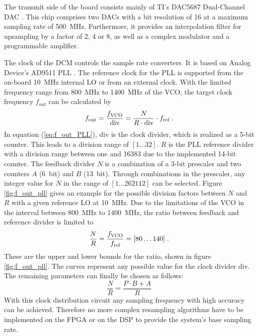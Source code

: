 The transmit side of the board consists mainly of \ac{TI}'s DAC5687 Dual\--Chan\-nel \ac{DAC} \cite{dac5687}. This chip comprises two \acp{DAC} with a bit resolution of 16 at a maximum sampling rate of \SI{500}{MHz}. Furthermore, it provides an interpolation filter for upsampling by a factor of 2, 4 or 8, as well as a complex modulator and a programmable amplifier. 

The clock of the \ac{DCM} controls the sample rate converters. It is based on Analog Device's AD9511 \ac{PLL} \cite{ad9511}. The reference clock for the \ac{PLL} is supported from the on-board \SI{10}{MHz} internal \ac{LO} or from an external clock. With the limited frequency range from \SI{800}{MHz} to \SI{1400}{MHz} of the \ac{VCO}, the target clock frequency $f_{out}$ can be calculated by
\begin{equation}
	f_{\textnormal{out}} =  \frac{f_{\textnormal{VCO}}}{\text{div}} = \frac{N}{R\cdot \text{div}}\cdot f_{\textnormal{ref}}\; .
	\label{eq:f_out_PLL}
\end{equation}
In equation (\ref{eq:f_out_PLL}), div is the clock divider, which is realized as a 5-bit counter. This leads to a division range of $[1\dots32]$. $R$ is the \ac{PLL} reference divider with a division range between one and 16383 due to the implemented 14-bit counter. The feedback divider $N$ is a combination of a 3-bit prescaler and two counters $A$ (\SI{6}{bit}) and $B$ (\SI{13}{bit}). Through combinations in the prescaler, any integer value for $N$ in the range of $[1\dots262112]$ can be selected.
Figure \ref{fig:f_out_pll} gives an example for the possible division factors between $N$ and $R$ with a given reference \ac{LO} at \SI{10}{MHz}. Due to the limitations of the \ac{VCO} in the interval between \SI{800}{MHz} to \SI{1400}{MHz}, the ratio between feedback and reference divider is limited to
\begin{equation}
	\frac{N}{R} =  \frac{f_{\textnormal{VCO}}}{f_{\textnormal{ref}}} = [80 \dots 140] \;.
	\label{eq:frac_N_R}
\end{equation}
These are the upper and lower bounds for the ratio, shown in figure \ref{fig:f_out_pll}. The curves represent any possible value for the clock divider div. The remaining parameters can finally be chosen as follows:
\begin{equation}
	\frac{N}{R} =  \frac{P\cdot B+A}{R}
	\label{eq:frac_N_R_2}
\end{equation}
With this clock distribution circuit any sampling frequency with high accuracy can be achieved. Therefore no more complex resampling algorithms have to be implemented on the \ac{FPGA} or on the \ac{DSP} to provide the system's base sampling rate.

